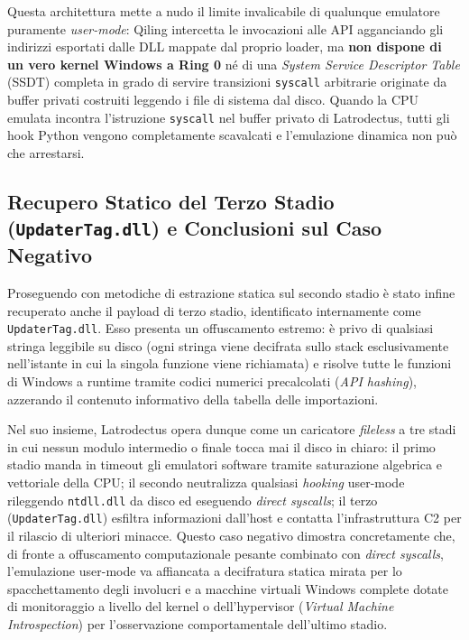 \documentclass[11pt, a4paper]{article}
\begin{document}
Questa architettura mette a nudo il limite invalicabile di qualunque emulatore puramente \textit{user-mode}: Qiling intercetta le invocazioni alle API agganciando gli indirizzi esportati dalle DLL mappate dal proprio loader, ma \textbf{non dispone di un vero kernel Windows a Ring 0} n\'e di una \textit{System Service Descriptor Table} (SSDT) completa in grado di servire transizioni \texttt{syscall} arbitrarie originate da buffer privati costruiti leggendo i file di sistema dal disco. Quando la CPU emulata incontra l'istruzione \texttt{syscall} nel buffer privato di Latrodectus, tutti gli hook Python vengono completamente scavalcati e l'emulazione dinamica non pu\`o che arrestarsi.

\subsection{Recupero Statico del Terzo Stadio (\texttt{UpdaterTag.dll}) e Conclusioni sul Caso Negativo}

Proseguendo con metodiche di estrazione statica sul secondo stadio \`e stato infine recuperato anche il payload di terzo stadio, identificato internamente come \texttt{Updater\allowbreak{}Tag.\allowbreak{}dll}. Esso presenta un offuscamento estremo: \`e privo di qualsiasi stringa leggibile su disco (ogni stringa viene decifrata sullo stack esclusivamente nell'istante in cui la singola funzione viene richiamata) e risolve tutte le funzioni di Windows a runtime tramite codici numerici precalcolati (\textit{API hashing}), azzerando il contenuto informativo della tabella delle importazioni.

Nel suo insieme, Latrodectus opera dunque come un caricatore \textit{fileless} a tre stadi in cui nessun modulo intermedio o finale tocca mai il disco in chiaro: il primo stadio manda in timeout gli emulatori software tramite saturazione algebrica e vettoriale della CPU; il secondo neutralizza qualsiasi \textit{hooking} user-mode rileggendo \texttt{ntdll.dll} da disco ed eseguendo \textit{direct syscalls}; il terzo (\texttt{Updater\allowbreak{}Tag.\allowbreak{}dll}) esfiltra informazioni dall'host e contatta l'infrastruttura C2 per il rilascio di ulteriori minacce. Questo caso negativo dimostra concretamente che, di fronte a offuscamento computazionale pesante combinato con \textit{direct syscalls}, l'emulazione user-mode va affiancata a decifratura statica mirata per lo spacchettamento degli involucri e a macchine virtuali Windows complete dotate di monitoraggio a livello del kernel o dell'hypervisor (\textit{Virtual Machine Introspection}) per l'osservazione comportamentale dell'ultimo stadio.
\end{document}
